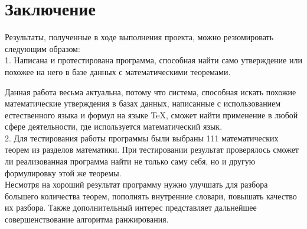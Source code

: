 \documentclass[12pt]{article}
\begin{document}
\newpage
\section*{Заключение}
Результаты, полученные в ходе выполнения проекта, можно резюмировать следующим образом: \\

1. Написана и протестирована программа, способная найти само утверждение или похожее на него в базе данных с математическими теоремами.\vskip 0.3cm

Данная работа весьма актуальна, потому что система, способная искать похожие математические утверждения в базах данных, написанные с использованием естественного языка и формул на языке TeX, сможет найти применение в любой сфере деятельности, где используется математический язык.  \\

2. Для тестирования работы программы были выбраны 111 математических теорем из разделов математики. При тестировании результат проверялось сможет ли реализованная программа найти не только саму себя, но и другую формулировку этой же теоремы. \\

Несмотря на хороший результат программу нужно улучшать для разбора большего количества теорем, пополнять внутренние словари, повышать качество их разбора. Также дополнительный интерес представляет дальнейшее совершенствование алгоритма ранжирования.
\end{document}
